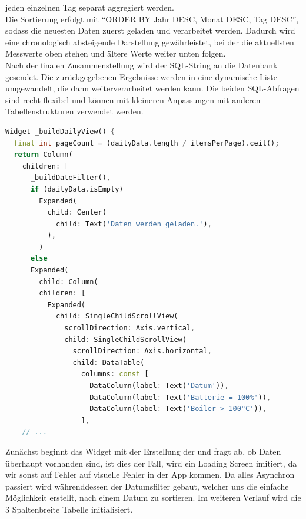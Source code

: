 \documentclass{article}
\begin{document}
    jeden einzelnen Tag separat aggregiert werden. \\
    Die Sortierung erfolgt mit \enquote{ORDER BY Jahr DESC, Monat DESC, Tag DESC}, sodass die neuesten
    Daten zuerst geladen und verarbeitet werden.
    Dadurch wird eine chronologisch absteigende Darstellung gewährleistet, bei der die aktuellsten
    Messwerte oben stehen und ältere Werte weiter unten folgen. \\
    Nach der finalen Zusammenstellung wird der SQL-String an die Datenbank gesendet.
    Die zurückgegebenen Ergebnisse werden in eine dynamische Liste umgewandelt, die dann weiterverarbeitet werden kann.
    Die beiden SQL-Abfragen sind recht flexibel und können mit kleineren Anpassungen mit anderen
    Tabellenstrukturen verwendet werden.
    \begin{lstlisting}[language=Dart]
Widget _buildDailyView() {
  final int pageCount = (dailyData.length / itemsPerPage).ceil();
  return Column(
    children: [
      _buildDateFilter(),
      if (dailyData.isEmpty)
        Expanded(
          child: Center(
            child: Text('Daten werden geladen.'),
          ),
        )
      else
      Expanded(
        child: Column(
        children: [
          Expanded(
            child: SingleChildScrollView(
              scrollDirection: Axis.vertical,
              child: SingleChildScrollView(
                scrollDirection: Axis.horizontal,
                child: DataTable(
                  columns: const [
                    DataColumn(label: Text('Datum')),
                    DataColumn(label: Text('Batterie = 100%')),
                    DataColumn(label: Text('Boiler > 100°C')),
                  ],
    // ...
    \end{lstlisting}
    Zunächst beginnt das Widget mit der Erstellung der und fragt ab, ob Daten überhaupt vorhanden sind, ist dies der Fall, wird ein Loading Screen imitiert,
    da wir sonst auf Fehler auf visuelle Fehler in der App kommen.
    Da alles Asynchron passiert wird währenddessen der Datumsfilter gebaut, welcher uns die einfache Möglichkeit erstellt,
    nach einem Datum zu sortieren.
    Im weiteren Verlauf wird die 3 Spaltenbreite Tabelle initialisiert.
\end{document}
